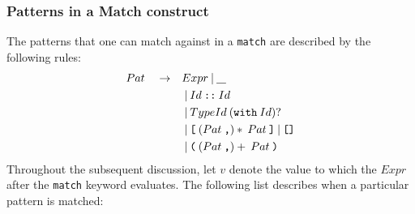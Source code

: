 \documentclass[a4paper, 12pt]{article}
\newcommand{\sepbar}{\: | \:}	%
\newcommand{\substo}{\quad\rightarrow\quad}
\newcommand{\uscore}{\underline{\hspace{0.3cm}}}
\begin{document}
\subsubsection{Patterns in a Match construct}\label{expr:pat}
The patterns that one can match against in a \texttt{match} are described by the following rules:
\begin{align*}
Pat \substo& Expr \sepbar \uscore\\
& \sepbar Id\:\texttt{::}\: Id\\
& \sepbar TypeId \: (\texttt{with}\: Id)?\\
& \sepbar \texttt{[} \: ( Pat\:\texttt{,})*\: Pat \: \texttt{]} \sepbar  \texttt{[]}\\
& \sepbar \texttt{(} \: ( Pat\:\texttt{,})+\: Pat\: \texttt{)}
\end{align*}
Throughout the subsequent discussion, let $v$ denote the value to which the $Expr$ after the \texttt{match} keyword evaluates. The following list describes when a particular pattern is matched:
\end{document}

